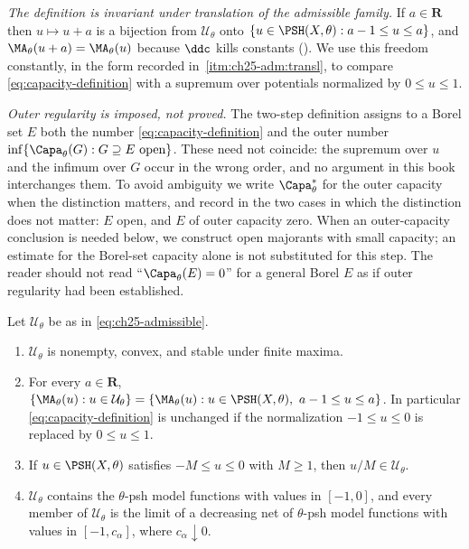 \emph{The definition is invariant under translation of the admissible
family.}  If $a\in\mathbf R$ then $u\mapsto u+a$ is a bijection from
$\mathcal U_\theta$ onto $\{u\in\PSH(X,\theta):a-1\leq u\leq a\}$, and
$\MA_\theta(u+a)=\MA_\theta(u)$ because $\ddc$ kills constants
().  We use this freedom constantly, in the form recorded
in \,\cref{itm:ch25-adm:transl}, to compare
\eqref{eq:capacity-definition} with a supremum over potentials normalized by
$0\leq u\leq1$.

\emph{Outer regularity is imposed, not proved.}  The two-step definition
assigns to a Borel set $E$ both the number \eqref{eq:capacity-definition}
and the outer number $\inf\{\Capa_\theta(G):G\supseteq E\ \text{open}\}$.
These need not coincide: the supremum over $u$ and the infimum over $G$
occur in the wrong order, and no argument in this book interchanges them.  To
avoid ambiguity we write $\Capa_\theta^*$ for the outer capacity when the
distinction matters, and record in  the two cases
in which the distinction does not matter: $E$ open, and $E$ of outer
capacity zero.  When an outer-capacity conclusion is needed below, we
construct open majorants with small capacity; an estimate for the Borel-set
capacity alone is not substituted for this step.  The reader should not read
``$\Capa_\theta(E)=0$'' for a general Borel $E$ as if outer regularity
had been established.

\begin{lemma}
\label{lem:ch25-admissible-calculus}
Let $\mathcal U_\theta$ be as in \eqref{eq:ch25-admissible}.
\begin{enumerate}
\item\label{itm:ch25-adm:nonempty}
 $\mathcal U_\theta$ is nonempty, convex, and stable under finite maxima.
\item\label{itm:ch25-adm:transl}
 For every $a\in\mathbf R$,
 $\{\MA_\theta(u):u\in\mathcal U_\theta\}
   =\{\MA_\theta(u):u\in\PSH(X,\theta),\ a-1\leq u\leq a\}$.
 In particular \eqref{eq:capacity-definition} is unchanged if the
 normalization $-1\leq u\leq0$ is replaced by $0\leq u\leq1$.
\item\label{itm:ch25-adm:scale}
 If $u\in\PSH(X,\theta)$ satisfies $-M\leq u\leq0$ with $M\geq1$, then
 $u/M\in\mathcal U_\theta$.
\item\label{itm:ch25-adm:model}
 $\mathcal U_\theta$ contains the $\theta$-psh model functions with
 values in $[-1,0]$, and every member of $\mathcal U_\theta$ is the limit
 of a decreasing net of $\theta$-psh model functions with values in
 $[-1,c_\alpha]$, where $c_\alpha\downarrow0$.
\end{enumerate}
\end{lemma}

